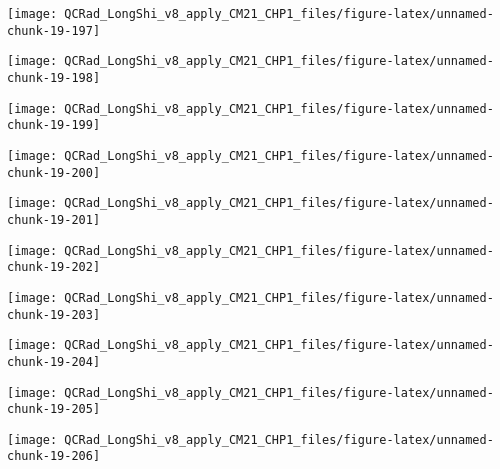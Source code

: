 \documentclass[
  10pt,
  a4paper,oneside]{article}
\begin{document}
\begin{center}\texttt{[image: QCRad\_LongShi\_v8\_apply\_CM21\_CHP1\_files/figure-latex/unnamed-chunk-19-197]} \end{center}

\begin{center}\texttt{[image: QCRad\_LongShi\_v8\_apply\_CM21\_CHP1\_files/figure-latex/unnamed-chunk-19-198]} \end{center}

\begin{center}\texttt{[image: QCRad\_LongShi\_v8\_apply\_CM21\_CHP1\_files/figure-latex/unnamed-chunk-19-199]} \end{center}

\begin{center}\texttt{[image: QCRad\_LongShi\_v8\_apply\_CM21\_CHP1\_files/figure-latex/unnamed-chunk-19-200]} \end{center}

\begin{center}\texttt{[image: QCRad\_LongShi\_v8\_apply\_CM21\_CHP1\_files/figure-latex/unnamed-chunk-19-201]} \end{center}

\begin{center}\texttt{[image: QCRad\_LongShi\_v8\_apply\_CM21\_CHP1\_files/figure-latex/unnamed-chunk-19-202]} \end{center}

\begin{center}\texttt{[image: QCRad\_LongShi\_v8\_apply\_CM21\_CHP1\_files/figure-latex/unnamed-chunk-19-203]} \end{center}

\begin{center}\texttt{[image: QCRad\_LongShi\_v8\_apply\_CM21\_CHP1\_files/figure-latex/unnamed-chunk-19-204]} \end{center}

\begin{center}\texttt{[image: QCRad\_LongShi\_v8\_apply\_CM21\_CHP1\_files/figure-latex/unnamed-chunk-19-205]} \end{center}

\begin{center}\texttt{[image: QCRad\_LongShi\_v8\_apply\_CM21\_CHP1\_files/figure-latex/unnamed-chunk-19-206]} \end{center}
\end{document}
